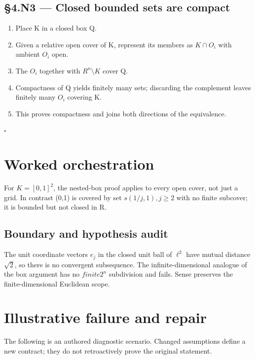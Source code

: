 \documentclass[preprint,12pt,aps,pra,showkeys,amsmath,amssymb,superscriptaddress,floatfix]{revtex4-2}
\theoremstyle{definition}
\theoremstyle{remark}
\begin{document}
\subsection{§4.N3 --- Closed bounded sets are
compact}\label{n3-closed-bounded-sets-are-compact}

\begin{enumerate}
\def\labelenumi{\arabic{enumi}.}
\item
  Place K in a closed box Q.
\item
  Given a relative open cover of K, represent its members as
  \(K\cap O_i\) with ambient \(O_i\) open.
\item
  The \(O_i\) together with \(R^{n}\setminus K\) cover Q.
\item
  Compactness of Q yields finitely many sets; discarding the complement
  leaves finitely many \(O_i\) covering K.
\item
  This proves compactness and joins both directions of the equivalence.
\end{enumerate}

\hfill$\square$

\section{Worked orchestration}

For \(K=[0,1]^{2}\), the nested-box proof applies to every open cover,
not just a grid. In contrast (0,1) is covered by set \(s(1/j,1),j\ge 2\)
with no finite subcover; it is bounded but not closed in R.

\subsection{Boundary and hypothesis audit}

The unit coordinate vectors \(e_j\) in the closed unit ball of
\(\ell ^{2}\) have mutual distance \(\sqrt{2}\), so there is no
convergent subsequence. The infinite-dimensional analogue of the box
argument has no \(finite2^{n}\) subdivision and fails. Sense preserves
the finite-dimensional Euclidean scope.

\section{Illustrative failure and repair}

The following is an authored diagnostic scenario. Changed assumptions
define a new contract; they do not retroactively prove the original
statement.
\end{document}
